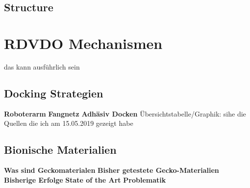 		\subsection{Structure}
				
	\section{RDVDO Mechanismen} das kann ausführlich sein
		\subsection{Docking Strategien}
						\textbf{Roboterarm}
						\textbf{Fangnetz}
						\textbf{Adhäsiv Docken}
						Übersichtstabelle/Graphik: sihe die Quellen die ich am 15.05.2019 gezeigt habe
		\subsection{Bionische Materialien}
						\textbf{Was sind Geckomaterialen}
						\textbf{Bisher getestete Gecko-Materialien}
						\textbf{Bisherige Erfolge}
						\textbf{State of the Art}
						\textbf{Problematik}